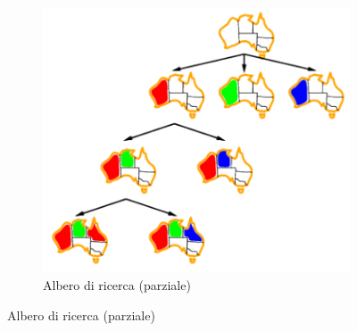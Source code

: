 \documentclass[11pt,oneside]{book}
\begin{document}
\begin{figure}[htp]
\begin{subfigure}{0.49\textwidth}
		\includegraphics[width=\textwidth, height=\textheight, keepaspectratio]{backtracking-example.png}
		\caption{Albero di ricerca (parziale)}
	\end{subfigure}
\end{figure}
\end{document}
